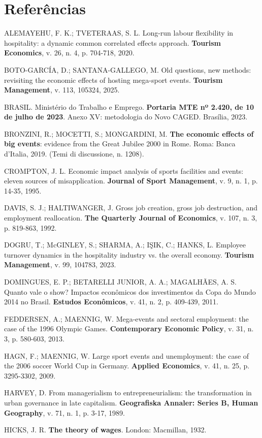 \documentclass[12pt,a4paper]{article}
\newenvironment{referencias}{%
  \section*{Referências}
  \begin{singlespace}
  \setlength{\parindent}{0pt}
  \setlength{\parskip}{6pt}
  \raggedright
}{%
  \end{singlespace}
}
\begin{document}
\begin{referencias}

ALEMAYEHU, F. K.; TVETERAAS, S. L. Long-run labour flexibility in
hospitality: a dynamic common correlated effects approach. \textbf{Tourism
Economics}, v. 26, n. 4, p. 704-718, 2020.

BOTO-GARCÍA, D.; SANTANA-GALLEGO, M. Old questions, new methods: revisiting
the economic effects of hosting mega-sport events. \textbf{Tourism
Management}, v. 113, 105324, 2025.

BRASIL. Ministério do Trabalho e Emprego. \textbf{Portaria MTE nº 2.420, de
10 de julho de 2023}. Anexo XV: metodologia do Novo CAGED. Brasília, 2023.

BRONZINI, R.; MOCETTI, S.; MONGARDINI, M. \textbf{The economic effects of
big events}: evidence from the Great Jubilee 2000 in Rome. Roma: Banca
d'Italia, 2019. (Temi di discussione, n. 1208).

CROMPTON, J. L. Economic impact analysis of sports facilities and events:
eleven sources of misapplication. \textbf{Journal of Sport Management}, v. 9,
n. 1, p. 14-35, 1995.

DAVIS, S. J.; HALTIWANGER, J. Gross job creation, gross job destruction, and
employment reallocation. \textbf{The Quarterly Journal of Economics}, v. 107,
n. 3, p. 819-863, 1992.

DOGRU, T.; McGINLEY, S.; SHARMA, A.; IŞIK, C.; HANKS, L. Employee turnover
dynamics in the hospitality industry vs. the overall economy.
\textbf{Tourism Management}, v. 99, 104783, 2023.

DOMINGUES, E. P.; BETARELLI JUNIOR, A. A.; MAGALHÃES, A. S. Quanto vale o
show? Impactos econômicos dos investimentos da Copa do Mundo 2014 no Brasil.
\textbf{Estudos Econômicos}, v. 41, n. 2, p. 409-439, 2011.

FEDDERSEN, A.; MAENNIG, W. Mega-events and sectoral employment: the case of
the 1996 Olympic Games. \textbf{Contemporary Economic Policy}, v. 31, n. 3,
p. 580-603, 2013.

HAGN, F.; MAENNIG, W. Large sport events and unemployment: the case of the
2006 soccer World Cup in Germany. \textbf{Applied Economics}, v. 41, n. 25,
p. 3295-3302, 2009.

HARVEY, D. From managerialism to entrepreneurialism: the transformation in
urban governance in late capitalism. \textbf{Geografiska Annaler: Series B,
Human Geography}, v. 71, n. 1, p. 3-17, 1989.

HICKS, J. R. \textbf{The theory of wages}. London: Macmillan, 1932.


\end{referencias}
\end{document}
